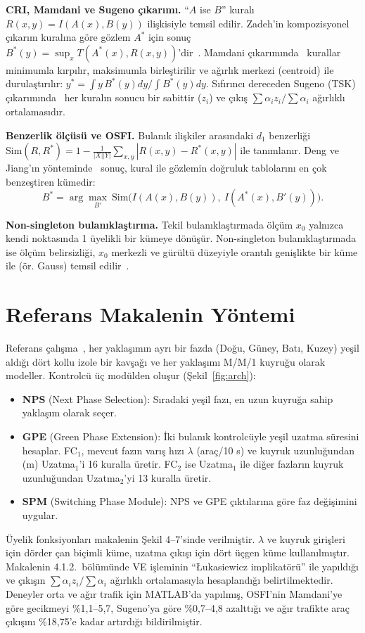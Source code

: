 \documentclass[11pt,a4paper]{article}
\theoremstyle{definition}
\begin{document}
\textbf{CRI, Mamdani ve Sugeno çıkarımı.} ``$A$ ise $B$'' kuralı $R(x,y)=I(A(x),B(y))$ ilişkisiyle temsil edilir. Zadeh'in kompozisyonel çıkarım kuralına göre gözlem $A^*$ için sonuç $B^*(y)=\sup_x T(A^*(x),R(x,y))$'dir~\cite{zadeh1973}. Mamdani çıkarımında~\cite{mamdani1975} kurallar minimumla kırpılır, maksimumla birleştirilir ve ağırlık merkezi (centroid) ile durulaştırılır: $y^*=\int y\,B^*(y)dy/\int B^*(y)dy$. Sıfırıncı dereceden Sugeno (TSK) çıkarımında~\cite{takagi1985} her kuralın sonucu bir sabittir ($z_i$) ve çıkış $\sum\alpha_iz_i/\sum\alpha_i$ ağırlıklı ortalamasıdır.

\textbf{Benzerlik ölçüsü ve OSFI.} Bulanık ilişkiler arasındaki $d_1$ benzerliği $\mathrm{Sim}(R,R^*)=1-\frac{1}{|X||Y|}\sum_{x,y}|R(x,y)-R^*(x,y)|$ ile tanımlanır. Deng ve Jiang'ın yönteminde~\cite{deng2014osfi} sonuç, kural ile gözlemin doğruluk tablolarını en çok benzeştiren kümedir:
\begin{equation}
B^*=\arg\max_{B'}\ \mathrm{Sim}\big(I(A(x),B(y)),\ I(A^*(x),B'(y))\big).
\label{eq:osfi}
\end{equation}

\textbf{Non-singleton bulanıklaştırma.} Tekil bulanıklaştırmada ölçüm $x_0$ yalnızca kendi noktasında 1 üyelikli bir kümeye dönüşür. Non-singleton bulanıklaştırmada ise ölçüm belirsizliği, $x_0$ merkezli ve gürültü düzeyiyle orantılı genişlikte bir küme ile (ör. Gauss) temsil edilir~\cite{mouzouris1997}.

\section{Referans Makalenin Yöntemi}
\label{sec:original}

Referans çalışma~\cite{esmaeili2025osfi}, her yaklaşımın ayrı bir fazda (Doğu, Güney, Batı, Kuzey) yeşil aldığı dört kollu izole bir kavşağı ve her yaklaşımı M/M/1 kuyruğu olarak modeller. Kontrolcü üç modülden oluşur (Şekil~\ref{fig:arch}):
\begin{itemize}
\item \textbf{NPS} (Next Phase Selection): Sıradaki yeşil fazı, en uzun kuyruğa sahip yaklaşım olarak seçer.
\item \textbf{GPE} (Green Phase Extension): İki bulanık kontrolcüyle yeşil uzatma süresini hesaplar. FC$_1$, mevcut fazın varış hızı $\lambda$ (araç/10 s) ve kuyruk uzunluğundan (m) Uzatma$_1$'i 16 kuralla üretir. FC$_2$ ise Uzatma$_1$ ile diğer fazların kuyruk uzunluğundan Uzatma$_2$'yi 13 kuralla üretir.
\item \textbf{SPM} (Switching Phase Module): NPS ve GPE çıktılarına göre faz değişimini uygular.
\end{itemize}
Üyelik fonksiyonları makalenin Şekil 4--7'sinde verilmiştir. $\lambda$ ve kuyruk girişleri için dörder çan biçimli küme, uzatma çıkışı için dört üçgen küme kullanılmıştır. Makalenin 4.1.2.~bölümünde VE işleminin ``Łukasiewicz implikatörü'' ile yapıldığı ve çıkışın $\sum\alpha_iz_i/\sum\alpha_i$ ağırlıklı ortalamasıyla hesaplandığı belirtilmektedir. Deneyler orta ve ağır trafik için MATLAB'da yapılmış, OSFI'nin Mamdani'ye göre gecikmeyi \%1,1--5,7, Sugeno'ya göre \%0,7--4,8 azalttığı ve ağır trafikte araç çıkışını \%18,75'e kadar artırdığı bildirilmiştir.
\end{document}

